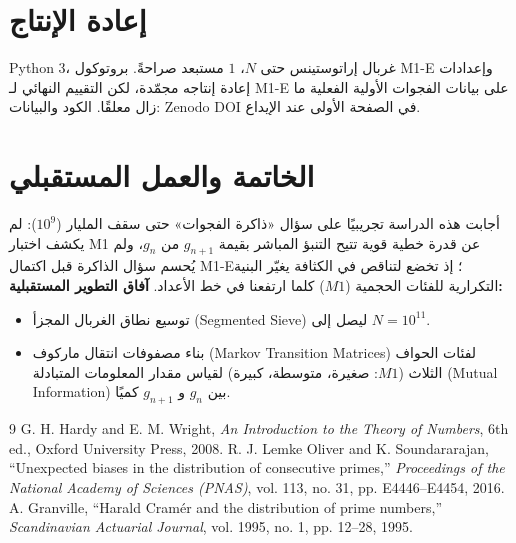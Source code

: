 \documentclass[12pt,a4paper]{article}
\begin{document}
\section{إعادة الإنتاج}
\textenglish{Python 3}، غربال إراتوستينس حتى $N$، $1$ مستبعد صراحةً. بروتوكول \textenglish{M1-E} وإعدادات إعادة إنتاجه مجمّدة، لكن التقييم النهائي لـ \textenglish{M1-E} على بيانات الفجوات الأولية الفعلية ما زال معلقًا. الكود والبيانات: \textenglish{Zenodo DOI} في الصفحة الأولى عند الإيداع.

\section{الخاتمة والعمل المستقبلي}
أجابت هذه الدراسة تجريبيًا على سؤال «ذاكرة الفجوات» حتى سقف المليار ($10^9$): لم يكشف اختبار \textenglish{M1} عن قدرة خطية قوية تتيح التنبؤ المباشر بقيمة $g_{n+1}$ من $g_n$، ولم يُحسم سؤال الذاكرة قبل اكتمال \textenglish{M1-E}؛ إذ تخضع لتناقص في الكثافة يغيّر البنية التكرارية للفئات الحجمية ($M1$) كلما ارتفعنا في خط الأعداد.
\textbf{آفاق التطوير المستقبلية:}
\begin{itemize}
\item توسيع نطاق الغربال المجزأ (\textenglish{Segmented Sieve}) ليصل إلى $N = 10^{11}$.
\item بناء مصفوفات انتقال ماركوف (\textenglish{Markov Transition Matrices}) لفئات الحواف الثلاث ($M1$: صغيرة، متوسطة، كبيرة) لقياس مقدار المعلومات المتبادلة (\textenglish{Mutual Information}) بين $g_n$ و $g_{n+1}$ كميًا.
\end{itemize}

\begin{thebibliography}{9}
G. H. Hardy and E. M. Wright, \textit{An Introduction to the Theory of Numbers}, 6th ed., Oxford University Press, 2008.
R. J. Lemke Oliver and K. Soundararajan, ``Unexpected biases in the distribution of consecutive primes,'' \textit{Proceedings of the National Academy of Sciences (PNAS)}, vol. 113, no. 31, pp. E4446--E4454, 2016.
A. Granville, ``Harald Cramér and the distribution of prime numbers,'' \textit{Scandinavian Actuarial Journal}, vol. 1995, no. 1, pp. 12--28, 1995.
\end{thebibliography}
\end{document}
